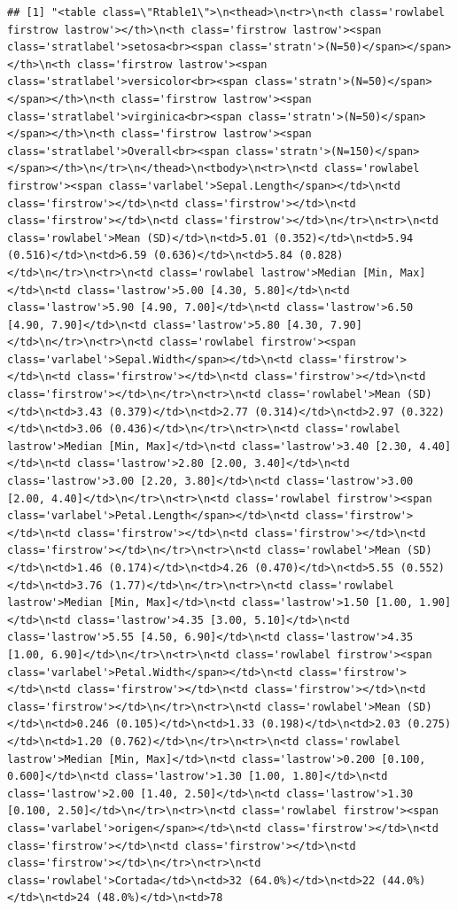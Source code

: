 \documentclass[
]{book}
\begin{document}
\begin{verbatim}
## [1] "<table class=\"Rtable1\">\n<thead>\n<tr>\n<th class='rowlabel firstrow lastrow'></th>\n<th class='firstrow lastrow'><span class='stratlabel'>setosa<br><span class='stratn'>(N=50)</span></span></th>\n<th class='firstrow lastrow'><span class='stratlabel'>versicolor<br><span class='stratn'>(N=50)</span></span></th>\n<th class='firstrow lastrow'><span class='stratlabel'>virginica<br><span class='stratn'>(N=50)</span></span></th>\n<th class='firstrow lastrow'><span class='stratlabel'>Overall<br><span class='stratn'>(N=150)</span></span></th>\n</tr>\n</thead>\n<tbody>\n<tr>\n<td class='rowlabel firstrow'><span class='varlabel'>Sepal.Length</span></td>\n<td class='firstrow'></td>\n<td class='firstrow'></td>\n<td class='firstrow'></td>\n<td class='firstrow'></td>\n</tr>\n<tr>\n<td class='rowlabel'>Mean (SD)</td>\n<td>5.01 (0.352)</td>\n<td>5.94 (0.516)</td>\n<td>6.59 (0.636)</td>\n<td>5.84 (0.828)</td>\n</tr>\n<tr>\n<td class='rowlabel lastrow'>Median [Min, Max]</td>\n<td class='lastrow'>5.00 [4.30, 5.80]</td>\n<td class='lastrow'>5.90 [4.90, 7.00]</td>\n<td class='lastrow'>6.50 [4.90, 7.90]</td>\n<td class='lastrow'>5.80 [4.30, 7.90]</td>\n</tr>\n<tr>\n<td class='rowlabel firstrow'><span class='varlabel'>Sepal.Width</span></td>\n<td class='firstrow'></td>\n<td class='firstrow'></td>\n<td class='firstrow'></td>\n<td class='firstrow'></td>\n</tr>\n<tr>\n<td class='rowlabel'>Mean (SD)</td>\n<td>3.43 (0.379)</td>\n<td>2.77 (0.314)</td>\n<td>2.97 (0.322)</td>\n<td>3.06 (0.436)</td>\n</tr>\n<tr>\n<td class='rowlabel lastrow'>Median [Min, Max]</td>\n<td class='lastrow'>3.40 [2.30, 4.40]</td>\n<td class='lastrow'>2.80 [2.00, 3.40]</td>\n<td class='lastrow'>3.00 [2.20, 3.80]</td>\n<td class='lastrow'>3.00 [2.00, 4.40]</td>\n</tr>\n<tr>\n<td class='rowlabel firstrow'><span class='varlabel'>Petal.Length</span></td>\n<td class='firstrow'></td>\n<td class='firstrow'></td>\n<td class='firstrow'></td>\n<td class='firstrow'></td>\n</tr>\n<tr>\n<td class='rowlabel'>Mean (SD)</td>\n<td>1.46 (0.174)</td>\n<td>4.26 (0.470)</td>\n<td>5.55 (0.552)</td>\n<td>3.76 (1.77)</td>\n</tr>\n<tr>\n<td class='rowlabel lastrow'>Median [Min, Max]</td>\n<td class='lastrow'>1.50 [1.00, 1.90]</td>\n<td class='lastrow'>4.35 [3.00, 5.10]</td>\n<td class='lastrow'>5.55 [4.50, 6.90]</td>\n<td class='lastrow'>4.35 [1.00, 6.90]</td>\n</tr>\n<tr>\n<td class='rowlabel firstrow'><span class='varlabel'>Petal.Width</span></td>\n<td class='firstrow'></td>\n<td class='firstrow'></td>\n<td class='firstrow'></td>\n<td class='firstrow'></td>\n</tr>\n<tr>\n<td class='rowlabel'>Mean (SD)</td>\n<td>0.246 (0.105)</td>\n<td>1.33 (0.198)</td>\n<td>2.03 (0.275)</td>\n<td>1.20 (0.762)</td>\n</tr>\n<tr>\n<td class='rowlabel lastrow'>Median [Min, Max]</td>\n<td class='lastrow'>0.200 [0.100, 0.600]</td>\n<td class='lastrow'>1.30 [1.00, 1.80]</td>\n<td class='lastrow'>2.00 [1.40, 2.50]</td>\n<td class='lastrow'>1.30 [0.100, 2.50]</td>\n</tr>\n<tr>\n<td class='rowlabel firstrow'><span class='varlabel'>origen</span></td>\n<td class='firstrow'></td>\n<td class='firstrow'></td>\n<td class='firstrow'></td>\n<td class='firstrow'></td>\n</tr>\n<tr>\n<td class='rowlabel'>Cortada</td>\n<td>32 (64.0%)</td>\n<td>22 (44.0%)</td>\n<td>24 (48.0%)</td>\n<td>78 
\end{verbatim}
\end{document}
